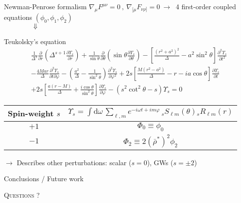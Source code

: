 \documentclass[9pt]{beamer}
\newcommand{\xDownarrow}[1]{%
	{\left\Downarrow\vbox to #1{}\right.\kern-\nulldelimiterspace}
}
\newcommand{\dd}{\mathrm{d}}
\begin{document}
\begin{frame}[fragile]{Newman-Penrose formalism}
	$\nabla_\mu F^{\mu\nu} = 0 ~,~ \nabla_{[\mu} F_{\nu\rho]} = 0  ~\longrightarrow~$ 4 first-order coupled equations $(\phi_0, \phi_1, \phi_2)$ \\
	$\hspace{1.5cm}\xDownarrow{0.25cm}$
	\begin{alertblock}{Teukolsky's equation}
		\begin{align*}
		& \frac{1}{\Delta^s} \frac{\partial}{\partial r} \left( \Delta^{s+1} \frac{\partial \Upsilon_s}{\partial r} \right) 
		+ \frac{1}{\sin\theta} \frac{\partial}{\partial\theta} \left( \sin\theta \frac{\partial \Upsilon_s}{\partial \theta} \right) 
		- \left[ \frac{(r^2+a^2)^2}{\Delta} - a^2 \sin^2\theta \right]\frac{\partial^2 \Upsilon_s}{\partial t^2} \\[0.15cm]
		& - \frac{4 M a r}{\Delta}\frac{\partial^2 \Upsilon_s}{\partial t \partial \varphi} 
		- \left( \frac{a^2}{\Delta} -\frac{1}{\sin^2\theta} \right)\frac{\partial^2 \Upsilon_s}{\partial \varphi^2} 
		+ 2s\left[ \frac{M(r^2-a^2)}{\Delta} - r - i a \cos\theta \right] \frac{\partial \Upsilon_s}{\partial t} \\[0.15cm]
		&+ 2s\left[ \frac{a(r-M)}{\Delta}+\frac{i \cos\theta}{\sin^2\theta}\right] \frac{\partial \Upsilon_s}{\partial \varphi}
		- (s^2 \cot^2\theta - s) \Upsilon_s = 0 
		\end{align*}
	\end{alertblock}
	
	\begin{center}
		\tabulinesep=0.5mm
		\begin{tabu}{|@{\hskip 0.25cm}c@{\hskip 0.25cm}|c@{\hskip 0.25cm}|}
			\hline
			Spin-weight $s$ & $\Upsilon_s = \int\dd\omega \,\sum_{\ell,m} e^{-i\omega t + i m \varphi} \, {}_{s}S_{\ell m}(\theta) {}_{s}R_{\ell m}(r) $ \\
			\hline\hline
			$+1$ & $\Phi_0 \equiv \phi_0$ \\
			\hline
			$-1$ & $\Phi_2 \equiv 2 (\bar{\rho}^*)^2 \phi_2$ \\
			\hline
		\end{tabu}
	\end{center}
	$\rightarrow$ Describes other perturbations: scalar ($s=0$), GWs ($s=\pm 2$)  
	
\end{frame}

\begin{frame}{Conclusions / Future work}
	
\end{frame}

\begin{frame}[standout]
	\huge\textsc{ Questions ? }
\end{frame}
\end{document}
